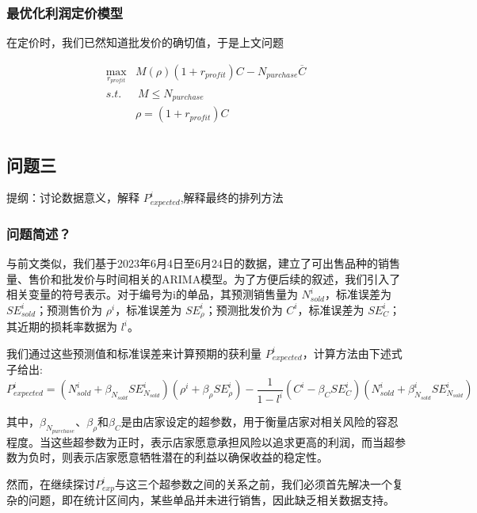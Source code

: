 \documentclass[withoutpreface,bwprint]{cumcmthesis} %
\begin{document}
 \subsubsection{最优化利润定价模型}
在定价时，我们已然知道批发价的确切值，于是上文问题
 
 
 \begin{align}
    \max_{r_{profit}}&M(\rho)(1+r_{profit})C-N_{purchase}\overline{C}\\
    s.t.&\ M \leq N_{purchase}\\
        & \rho=(1+r_{profit})C \\
\end{align}

\subsection{问题三}
提纲：{讨论数据意义，解释 $P_{expected}^i$,解释最终的排列方法}
\subsubsection{问题简述？}
与前文类似，我们基于2023年6月4日至6月24日的数据，建立了可出售品种的销售量、售价和批发价与时间相关的ARIMA模型。为了方便后续的叙述，我们引入了相关变量的符号表示。对于编号为i的单品，其预测销售量为 $N_{sold}^i$，标准误差为 $SE_{sold}^i$；预测售价为 $\rho^i$，标准误差为 $SE_{\rho}^i$；预测批发价为 $C^i$，标准误差为 $SE_{C}^i$；其近期的损耗率数据为 $l^i$。

我们通过这些预测值和标准误差来计算预期的获利量 $P_{expected}^i$，计算方法由下述式子给出:
\begin{equation}
    P_{expected}^i=(N_{sold}^i+\beta_{N_{sold}}SE_{N_{sold}}^i)(\rho^i+\beta_{\rho}SE_{\rho}^i)-\frac{1}{1-l^i}(C^i-\beta_{C}SE_{C}^i)(N_{sold}^i+\beta_{N_{sold}}^iSE_{N_{sold}}^i)
\end{equation}

其中，$\beta_{N_{purchase}}$、$\beta_{\rho}$和$\beta_{C}$是由店家设定的超参数，用于衡量店家对相关风险的容忍程度。当这些超参数为正时，表示店家愿意承担风险以追求更高的利润，而当超参数为负时，则表示店家愿意牺牲潜在的利益以确保收益的稳定性。

然而，在继续探讨$P_{exp}^i$与这三个超参数之间的关系之前，我们必须首先解决一个复杂的问题，即在统计区间内，某些单品并未进行销售，因此缺乏相关数据支持。
\end{document}
